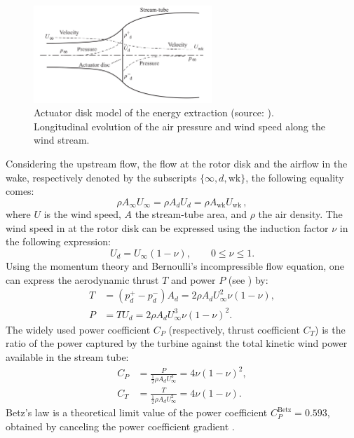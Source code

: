 \begin{figure}[!h]
    \centering
    \includegraphics[width=0.6\textwidth]{./part1/figures/actuator_disk.png}
    \caption{Actuator disk model of the energy extraction (source: \citealp{burton_2021_wind_handbook}). Longitudinal evolution of the air pressure and wind speed along the wind stream.}
    \label{fig:actuator_disk}
\end{figure}
Considering the upstream flow, the flow at the rotor disk and the airflow in the wake, respectively denoted by the subscripts $\{\infty, d, \mathrm{wk}\}$, the following equality comes:  
\begin{equation}
    \rho A_\infty U_\infty = \rho A_d U_d = \rho A_{\mathrm{wk}} U_{\mathrm{wk}} \, ,
\end{equation}
where $U$ is the wind speed, $A$ the stream-tube area, and $\rho$ the air density. 
The wind speed in at the rotor disk can be expressed using the induction factor $\nu$ in the following expression: 
\begin{equation}
    U_d = U_\infty (1 - \nu), \qquad 0\leq \nu \leq 1.
\end{equation}
Using the momentum theory and Bernoulli's incompressible flow equation, one can express the aerodynamic thrust $T$ and power $P$ (see \citealp{milano_thesis_2021}) by: 
\begin{subequations}
    \begin{align}
        T&=(p_d^+ - p_d^-) A_d = 2 \rho A_d U_\infty^2 \nu (1- \nu),\\
        P&= T U_d = 2 \rho A_d U_\infty^3 \nu (1- \nu)^2.
    \end{align}
    \label{eq:momentum_theory}
\end{subequations}
The widely used power coefficient $C_P$ (respectively, thrust coefficient $C_T$) is the ratio of the power captured by the turbine against the total kinetic wind power available in the stream tube: 
\begin{subequations}
    \begin{align}
        C_P &= \frac{P}{\frac12 \rho A_d U_\infty^3} = 4\nu (1-\nu)^2,\\
        C_T &= \frac{T}{\frac12 \rho A_d U_\infty^2} = 4\nu (1-\nu). 
    \end{align}
\end{subequations} 
Betz's law is a theoretical limit value of the power coefficient $C_P^{\mathrm{Betz}} = 0.593$, obtained by canceling the power coefficient gradient \citep{burton_2021_wind_handbook}. 



